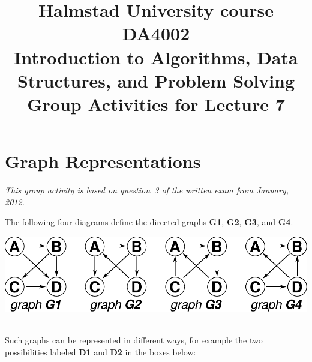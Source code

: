 \documentclass[a4paper]{article}
\begin{document}
\title{
  {\small
    Halmstad University course DA4002\\
    Introduction to Algorithms, Data Structures, and Problem Solving\\
  }
  Group Activities for Lecture 7
}
\maketitle



\section{Graph Representations}

\emph{This group activity is based on question~3 of the written exam from January, 2012.}

The following four diagrams define the directed graphs \textbf{G1}, \textbf{G2}, \textbf{G3}, and \textbf{G4}.\\[1.2\baselineskip]
\centerline{\includegraphics[width=0.6\columnwidth]{q3-graphs.pdf}}\\[1.2\baselineskip]
\noindent
Such graphs can be represented in different ways, for example the two possibilities labeled \textbf{D1} and \textbf{D2} in the boxes below:\\
\end{document}
